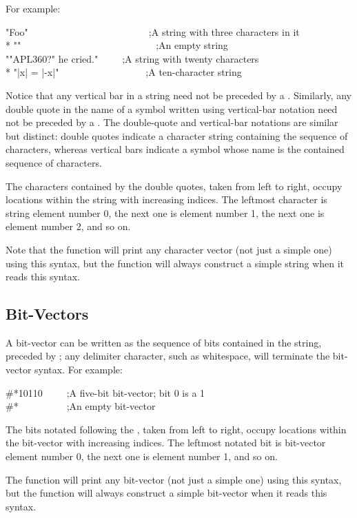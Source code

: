 {For example:

\begin{lisp}
"Foo"~~~~~~~~~~~~~~~~~~~~~~~~~;{\rm A string with three characters in it} \\*
""~~~~~~~~~~~~~~~~~~~~~~~~~~~~;{\rm An empty string} \\
"{\Xbackslash}"APL{\Xbackslash}{\Xbackslash}360?{\Xbackslash}" he cried."~~~~~;{\rm A string with twenty characters} \\*
"|x| = |-x|"~~~~~~~~~~~~~~~~~~;{\rm A ten-character string}
\end{lisp}
Notice that any vertical bar \cd{|} in a string need not be
preceded by a \cd{{\Xbackslash}}.  Similarly, any double quote in the name
of a symbol written using vertical-bar notation need not be
preceded by a \cd{{\Xbackslash}}.  The double-quote and vertical-bar notations
are similar but distinct: double quotes indicate a character string
containing the sequence of characters,
whereas vertical bars indicate a symbol whose name is the contained
sequence of characters.

The characters contained by the double quotes, taken from left to right,
occupy locations within the string with increasing indices.
The leftmost character is string element number 0, the next one
is element number 1, the next one is element number 2, and so on.

Note that the function  will print any character vector
(not just a simple one)
using this syntax, but the function  will always construct
a simple string when it reads this syntax.

\subsection{Bit-Vectors}

A bit-vector can be written as the sequence of bits contained in the
string, preceded by \cd{\#*}; any delimiter character, such as whitespace,
will terminate the bit-vector syntax.
For example:
\begin{lisp}
\#*10110~~~~~;{\rm A five-bit bit-vector; bit 0 is a 1} \\
\#*~~~~~~~~~~;{\rm An empty bit-vector}
\end{lisp}
The bits notated following the \cd{\#*}, taken from left to right,
occupy locations within the bit-vector with increasing indices.
The leftmost notated bit is bit-vector element number 0, the next one
is element number 1, and so on.

The function  will print any bit-vector (not just a simple one)
using this syntax, but the function  will always construct
a simple bit-vector when it reads this syntax.

}
